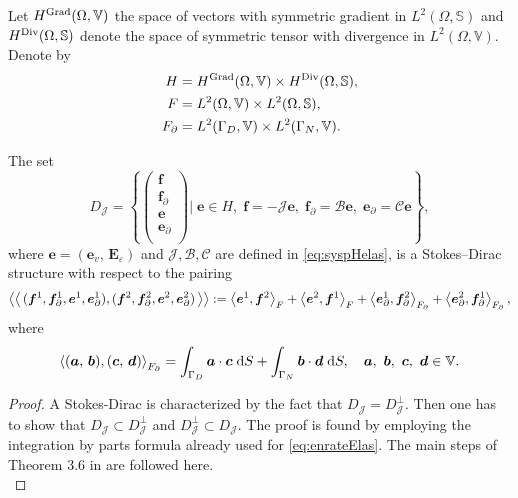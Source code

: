 \begin{theorem} \label{th:stdirElas}
Let $H^{\Grad}(\Omega, \mathbb{V})$ the space of vectors with symmetric gradient in $L^2(\Omega, \mathbb{S})$ and $H^{\Div}  (\Omega, \mathbb{S})$ denote the space of symmetric tensor with divergence in $L^2(\Omega, \mathbb{V})$. Denote by 
\begin{align*}
H &= H^{\Grad}(\Omega, \mathbb{V}) \times H^{\Div}(\Omega, \mathbb{S}), \\
F &= L^2(\Omega, \mathbb{V}) \times L^2(\Omega, \mathbb{S}), \\
F_\partial &= L^2(\Gamma_D, \mathbb{V}) \times L^2(\Gamma_N, \mathbb{V}).
\end{align*}

The set 
\begin{equation}
{D}_{\mathcal{J}} = \left\{
\begin{pmatrix}
\bm{f} \\ \bm{f}_\partial \\ \bm{e} \\ \bm{e}_\partial \\
\end{pmatrix}
\vert \;
 \bm{e} \in H, \; \bm{f} = -\mathcal{J} \bm{e}, \;\bm{f}_\partial = \mathcal{B}\bm{e}, \; \bm{e}_\partial = \mathcal{C}\bm{e}   \right\},
\end{equation}
where $\bm{e} = (\bm{e}_v,\, \bm{E}_\varepsilon)$ and $\mathcal{J, B, C}$ are defined in \eqref{eq:syspHelas}, is a Stokes–Dirac structure with respect to the pairing
\begin{equation}\label{eq:bilinearElas}
\bilprod{(\bm{f}^1, \bm{f}_{\partial}^1, \bm{e}^1, \bm{e}_{\partial}^1)}{(\bm{f}^2, \bm{f}_{\partial}^2, \bm{e}^2, \bm{e}_{\partial}^2)}  := \inner[F]{\bm{e}^1}{\bm{f}^2} + \inner[F]{\bm{e}^2}{\bm{f}^1} + \inner[F_\partial]{\bm{e}_{\partial}^1}{\bm{f}_{\partial}^2} + \inner[F_\partial]{\bm{e}_{\partial}^2}{\bm{f}_{\partial}^1},
\end{equation}
where 
\[
\inner[F_\partial]{(\bm{a}, \, \bm{b})}{(\bm{c}, \, \bm{d})} = \int_{\Gamma_D} \bm{a} \cdot \bm{c} \d{S} + \int_{\Gamma_N} \bm{b} \cdot \bm{d} \d{S}, \quad \bm{a},\ \bm{b},\ \bm{c},\ \bm{d} \in \mathbb{V}. 
\]
\begin{proof}
A Stokes-Dirac is characterized by the fact that ${D}_{\mathcal{J}} = {D}_{\mathcal{J}}^\perp$. Then one has to show that ${D}_{\mathcal{J}} \subset {D}_{\mathcal{J}}^\perp$ and ${D}_{\mathcal{J}}^\perp \subset {D}_{\mathcal{J}}$. The proof is found by employing the integration by parts formula  already used for \eqref{eq:enrateElas}. The main steps of Theorem 3.6 in \cite{legorrec2005} are followed here. \\


\end{proof}
\end{theorem}
